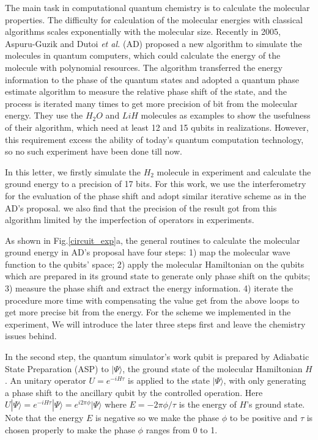 \documentclass[twocolumn,showpacs,twoside,10pt,superscriptaddress,prl]{revtex4}
\begin{document}
The main task in computational quantum chemistry is to calculate the
molecular properties. The difficulty for calculation of the
molecular energies with classical algorithms scales exponentially
with the molecular size\cite{molenergy}. Recently in 2005,
Aspuru-Guzik and Dutoi \emph{et al.} (AD)\cite{molenergy} proposed a
new algorithm to simulate the molecules in quantum computers, which
could calculate the energy of the molecule with polynomial
resources. The algorithm transferred the energy information to the
phase of the quantum states and adopted a quantum phase estimate
algorithm to measure the relative phase shift of the state, and the
process is iterated many times to get more precision of bit from the
molecular energy. They use the $H_2O$ and $LiH$ molecules as
examples to show the usefulness of their algorithm, which need at
least 12 and 15 qubits in realizations. However, this requirement
excess the ability of today's quantum computation technology, so no
such experiment have been done till now.

In this letter, we firstly simulate the $H_2$ molecule in experiment
and calculate the ground energy to a precision of 17 bits. For this
work, we use the interferometry for the evaluation of the phase
shift and adopt similar iterative scheme as in the AD's proposal. we
also find that the precision of the result got from this algorithm
limited by the imperfection of operators in experiments.



As shown in Fig.\ref{circuit_exp}a, the general routines to
calculate the molecular ground energy in AD's proposal have four
steps: 1) map the molecular wave function to the qubits' space; 2)
apply the molecular Hamiltonian on the qubits which are prepared in
its ground state to generate only phase shift on the qubits; 3)
measure the phase shift and extract the energy information. 4)
iterate the procedure more time with compensating the value get from
the above loops to get more precise bit from the energy. For the
scheme we implemented in the experiment, We will introduce the later
three steps first and leave the chemistry issues behind.

In the second step, the quantum simulator's work qubit is prepared
by Adiabatic State Preparation (ASP) to $|\Psi\rangle$, the ground
state of the molecular Hamiltonian $H$. An unitary operator
$U=e^{-iH\tau}$ is applied to the state $|\Psi\rangle$, with only
generating a phase shift to the ancillary qubit by the controlled
operation. Here
$U|\Psi\rangle=e^{-iH\tau}|\Psi\rangle=e^{i2\pi\phi}|\Psi\rangle$
where $E=-2\pi\phi/\tau$ is the energy of $H$'s ground state. Note
that the energy $E$ is negative so we make the phase $\phi$ to be
positive and $\tau$ is chosen properly to make the phase $\phi$
ranges from 0 to 1.
\end{document}
